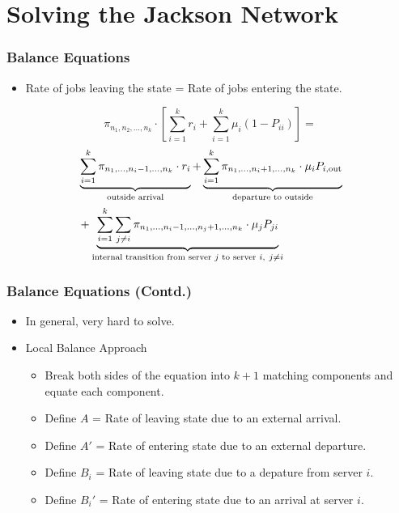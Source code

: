 \documentclass[10pt,notes]{beamer}
\begin{document}
\section{Solving the Jackson Network}

\begin{frame}
    \frametitle{Balance Equations}
    \begin{itemize}
        \item Rate of jobs leaving the state = Rate of jobs entering the state.
    \end{itemize}
    \begin{center} 
        \[\pi_{n_1,n_2,\ldots,n_k} \cdot \left[ \sum_{i=1}^{k} r_i + \sum_{i=1}^{k} \mu_i (1 - P_{ii})  \right] =\]
        \begin{equation}
            \linespread{1.6}
            \begin{aligned}
                \notag
                &\underbrace{\sum_{i=1}^{k} \pi_{n_1,\ldots,n_i - 1,\ldots,n_k} \cdot r_i}_{\text{outside arrival}}
                + \underbrace{\sum_{i=1}^{k} \pi_{n_1,\ldots,n_i + 1,\ldots,n_k} \cdot \mu_i P_{i,\text{out}}}_{\text{departure to outside}} \\
                &+ \underbrace{\sum_{i=1}^{k} \sum_{j \neq i} \pi_{n_1,\ldots,n_i - 1,\ldots,n_j + 1,\ldots,n_k} \cdot \mu_j P_{ji}}_{\text{internal transition from server } j \text{ to server } i, \ j \neq i}
            \end{aligned}
        \end{equation}

        
    \end{center}
    

\end{frame}

\begin{frame}
    \frametitle{Balance Equations (Contd.)}
    \begin{itemize}
        \item In general, very hard to solve.
        \item Local Balance Approach
        \begin{itemize}
            \item Break both sides of the equation into $k+1$ matching components and equate each component.
            \item Define $A$ = Rate of leaving state due to an external arrival.
            \item Define $A'$ = Rate of entering state due to an external departure.
            \item Define $B_i$ = Rate of leaving state due to a depature from server $i$.
            \item Define $B_i'$ = Rate of entering state due to an arrival at server $i$.
        \end{itemize}
    \end{itemize}
\end{frame}
\end{document}
